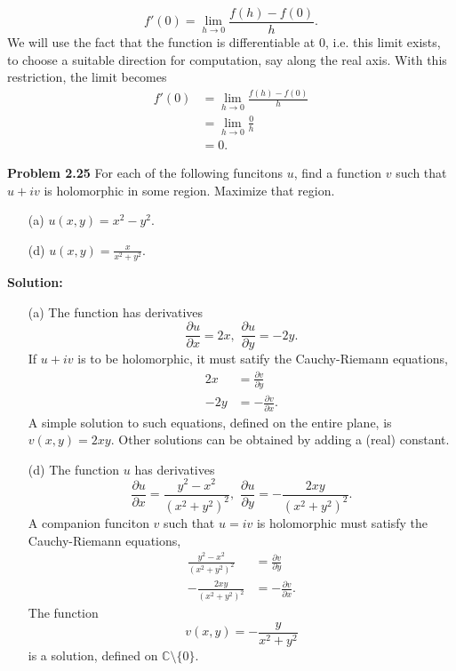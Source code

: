 \documentclass[12pt,oneside]{exam}
\newenvironment{exercise}[1]{\vspace{.1in}\noindent\textbf{Problem #1 \hspace{.05em}}}{}
\begin{document}
\begin{itemize}
\begin{equation*}
f'(0) = \lim_{h \to 0} \frac{f(h)-f(0)}{h}.
\end{equation*}
We will use the fact that the function is differentiable at $0$, i.e. this limit exists, to choose a suitable direction for computation, say along the real axis. With this restriction, the limit becomes
\begin{align*}
f'(0) & = \lim_{h \to 0} \frac{f(h)-f(0)}{h}\\
& = \lim_{h \to 0} \frac{0}{h}\\
& = 0.
\end{align*}
\end{itemize}

\vspace{1cm}

\begin{exercise}{2.25}
For each of the following funcitons $u$, find a function $v$ such that $u+iv$ is holomorphic in some region. Maximize that region. 
\begin{itemize}
\item[(a)] $u(x,y)=x^2-y^2$.
\item[(d)] $u(x,y) = \frac{x}{x^2+y^2}.$
\end{itemize}
\end{exercise}

\vspace{0.5cm}

\noindent \textbf{Solution:} 
\begin{itemize}
\item[(a)] The function has derivatives
\begin{equation*}
\frac{\partial u}{\partial x} = 2x, \, \, \frac{\partial u}{\partial y} = -2y.
\end{equation*}
If $u+iv$ is to be holomorphic, it must satify the Cauchy-Riemann equations, 
\begin{align*}
2x & = \frac{\partial v}{\partial y}\\
-2y & = -\frac{\partial v}{\partial x}.
\end{align*}
A simple solution to such equations, defined on the entire plane, is $v(x,y)=2xy$. Other solutions can be obtained by adding a (real) constant. 
\item[(d)] The function $u$ has derivatives
\begin{equation*}
\frac{\partial u}{\partial x} = \frac{y^2-x^2}{(x^2+y^2)^2}, \, \, \frac{\partial u}{\partial y}  = -\frac{2xy}{(x^2+y^2)^2}.
\end{equation*}
A companion funciton $v$ such that $u=iv$ is holomorphic must satisfy the Cauchy-Riemann equations, 
\begin{align*}
\frac{y^2-x^2}{(x^2+y^2)^2} & = \frac{\partial v}{\partial y}\\
-\frac{2xy}{(x^2+y^2)^2} & = - \frac{\partial v}{\partial x}.
\end{align*}
The function 
\begin{equation*}
v(x,y) = -\frac{y}{x^2+y^2}
\end{equation*}
is a solution, defined on $\mathbb{C} \setminus \{0\}$.
\end{itemize}
\end{document}
